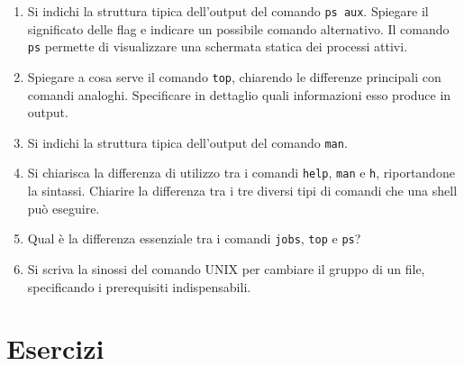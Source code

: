 \documentclass{report}
\begin{document}
\begin{enumerate}
\item Si indichi la struttura tipica dell’output del comando \texttt{ps aux}. Spiegare il significato delle flag e indicare un possibile comando alternativo. Il comando \texttt{ps} permette di visualizzare una schermata statica dei processi attivi.

\item Spiegare a cosa serve il comando \texttt{top}, chiarendo le differenze principali con comandi analoghi. Specificare in dettaglio quali informazioni esso produce in output.

\item Si indichi la struttura tipica dell’output del comando \texttt{man}.

\item Si chiarisca la differenza di utilizzo tra i comandi \texttt{help}, \texttt{man} e \texttt{h}, riportandone la sintassi. Chiarire la differenza tra i tre diversi tipi di comandi che una shell può eseguire.

\item Qual è la differenza essenziale tra i comandi \texttt{jobs}, \texttt{top} e \texttt{ps}?

\item Si scriva la sinossi del comando UNIX per cambiare il gruppo di un file, specificando i prerequisiti indispensabili.

\end{enumerate}

\section*{Esercizi}
\end{document}

